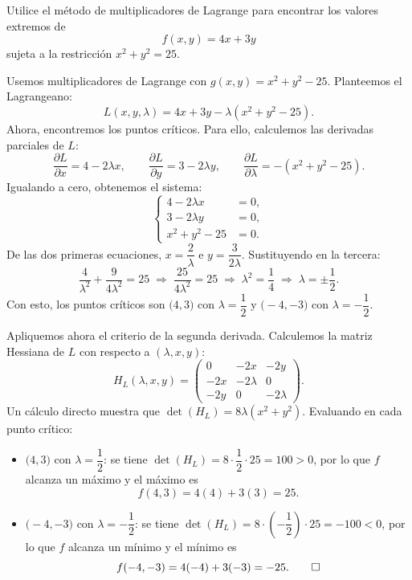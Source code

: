 \documentclass[10pt,a5]{aleph-examen}
\begin{document}
\begin{preguntas}
\item
Utilice el método de multiplicadores de Lagrange para encontrar los valores extremos de
\[
    f(x,y) = 4x + 3y
\]
sujeta a la restricción $x^2 + y^2 = 25$.

\begin{respuesta}
Usemos multiplicadores de Lagrange con $g(x,y) = x^2 + y^2 - 25$. Planteemos el Lagrangeano:
\[
    L(x,y,\lambda) = 4x + 3y - \lambda(x^2 + y^2 - 25).
\]
Ahora, encontremos los puntos críticos. Para ello, calculemos las derivadas parciales de $L$:
\[
    \frac{\partial L}{\partial x} = 4 - 2\lambda x,
    \qquad
    \frac{\partial L}{\partial y} = 3 - 2\lambda y,
    \qquad
    \frac{\partial L}{\partial \lambda} = -(x^2 + y^2 - 25).
\]
Igualando a cero, obtenemos el sistema:
\[
    \left\{
    \begin{aligned}
        4 - 2\lambda x &= 0,\\
        3 - 2\lambda y &= 0,\\
        x^2 + y^2 - 25 &= 0.
    \end{aligned}
    \right.
\]
De las dos primeras ecuaciones, $x = \dfrac{2}{\lambda}$ e $y = \dfrac{3}{2\lambda}$. Sustituyendo en la tercera:
\[
    \frac{4}{\lambda^2} + \frac{9}{4\lambda^2} = 25
    \;\Longrightarrow\;
    \frac{25}{4\lambda^2} = 25
    \;\Longrightarrow\;
    \lambda^2 = \frac{1}{4}
    \;\Longrightarrow\;
    \lambda = \pm\frac{1}{2}.
\]
Con esto, los puntos críticos son $\bigl(4,3\bigr)$ con $\lambda = \dfrac{1}{2}$ y $\bigl(-4,-3\bigr)$ con $\lambda = -\dfrac{1}{2}$.

Apliquemos ahora el criterio de la segunda derivada. Calculemos la matriz Hessiana de $L$ con respecto a $(\lambda, x, y)$:
\[
    H_L(\lambda,x,y)
    =
    \begin{pmatrix}
        0 & -2x & -2y\\[4pt]
        -2x & -2\lambda & 0\\[4pt]
        -2y & 0 & -2\lambda
    \end{pmatrix}.
\]
Un cálculo directo muestra que $\det(H_L) = 8\lambda(x^2 + y^2)$. Evaluando en cada punto crítico:
\begin{itemize}
    \item {$\bigl(4,3\bigr)$ con $\lambda = \dfrac{1}{2}$:} se tiene $\det(H_L) = 8\cdot\dfrac{1}{2}\cdot 25 = 100 > 0$, por lo que $f$ alcanza un {máximo} y el máximo es
    \[
        f(4,3) = 4(4) + 3(3) = 25.
    \]
    \item {$\bigl(-4,-3\bigr)$ con $\lambda = -\dfrac{1}{2}$:} se tiene $\det(H_L) = 8\cdot\left(-\dfrac{1}{2}\right)\cdot 25 = -100 < 0$, por lo que $f$ alcanza un {mínimo} y el mínimo es
    \[
        f(-4,-3) = 4(-4) + 3(-3) = -25.\qedhere
    \]
\end{itemize}
\end{respuesta}



\end{preguntas}
\end{document}
